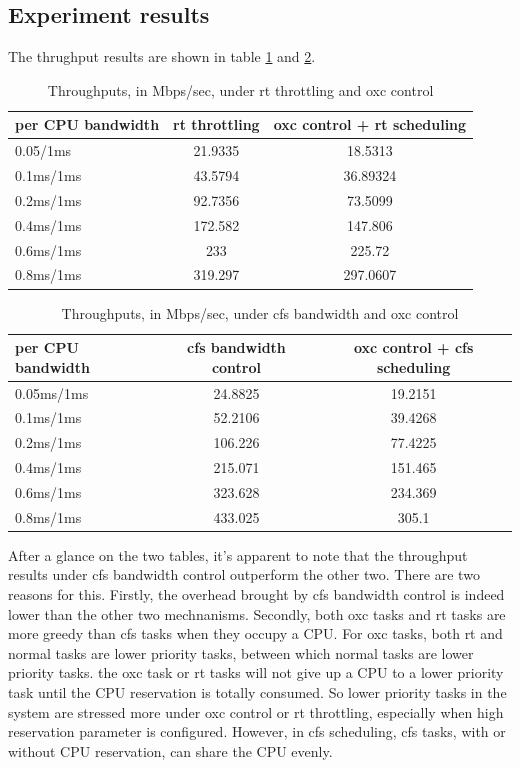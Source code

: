 \subsection{Experiment results}
The thrughput results are shown in table \ref{tab:expB1} and \ref{tab:expB2}.
\begin{table}[H]%
	\centering
	\begin{tabular}{|l||c|c|}\hline
		 per CPU bandwidth & rt throttling & oxc control + rt scheduling\\\hline
			0.05/1ms &	21.9335	&	18.5313	\\\hline 
			0.1ms/1ms &	43.5794 &	36.89324 \\\hline
			0.2ms/1ms &	92.7356 &	73.5099	\\\hline
			0.4ms/1ms &	172.582 &	147.806 \\\hline
			0.6ms/1ms &	233	&	225.72	\\\hline
			0.8ms/1ms &	319.297 &	297.0607	\\\hline
	\end{tabular}
	\caption{Throughputs, in Mbps/sec, under rt throttling and oxc control}
	\label{tab:expB1}
\end{table}
\begin{table}[H]%
	\centering
	\begin{tabular}{|l||c|c|}\hline
		 per CPU bandwidth & cfs bandwidth control & oxc control + cfs scheduling  \\\hline
		 0.05ms/1ms	& 24.8825	& 19.2151 \\\hline
		 0.1ms/1ms	& 52.2106	& 39.4268 \\\hline
		 0.2ms/1ms	& 106.226	& 77.4225 \\\hline
		 0.4ms/1ms	& 215.071	& 151.465 \\\hline
		 0.6ms/1ms	& 323.628	& 234.369 \\\hline
		 0.8ms/1ms	& 433.025	& 305.1 \\\hline
	\end{tabular}
	\caption{Throughputs, in Mbps/sec, under cfs bandwidth and oxc control}
	\label{tab:expB2}
\end{table}
After a glance on the two tables, it's apparent to note that the 
throughput results under cfs bandwidth control outperform the other two. 
There are two reasons for this. Firstly, the overhead brought by cfs 
bandwidth control is indeed lower than the other two mechnanisms.
Secondly, both oxc tasks and rt tasks are more greedy than cfs tasks when 
they occupy a CPU. For oxc tasks, both rt and normal tasks are lower
priority tasks, between which normal tasks are lower priority tasks.
the oxc task or rt tasks will not give up a CPU to a lower priority
task until the CPU reservation is totally consumed. So lower priority 
tasks in the system are stressed more under oxc control or rt throttling, 
especially when high reservation parameter is configured. However, in cfs 
scheduling, cfs tasks, with or without CPU reservation, can share the CPU 
evenly.

